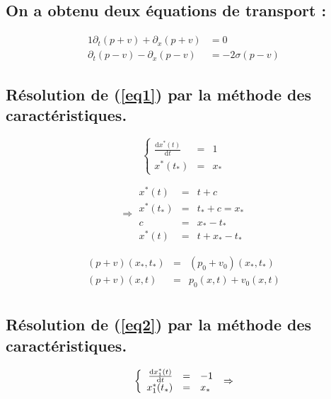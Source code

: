 \documentclass[a4paper,11pt]{article}
\begin{document}
\subsection*{On a obtenu deux équations de transport :}
\begin{alignat}{1}
    \partial_{t}(p+v) + \partial_{x}(p+v) &= 0 \label{eq1} \\
    \partial_{t}(p-v) - \partial_{x}(p-v) &= -2\sigma(p-v) \label{eq2}
\end{alignat}

\subsection*{Résolution de (\ref{eq1}) par la méthode des caractéristiques.}

\begin{equation*}
\left\{
\begin{array}{rcl} 
    \frac{\mathrm{d}x^{*}(t)}{\mathrm{d}t} &=& 1 \\    
    x^{*}(t_{*}) &=& x_{*}
\end{array}
\right.
\end{equation*}

\begin{equation*}
\Rightarrow
\begin{array}{rcl}
x^{*}(t) &=& t +c \\
x^{*}(t_{*}) &=& t_{*}+c = x_{*}\\
c &=& x_{*}-t_{*} \\
x^{*}(t) &=& t + x_{*}-t_{*}
\end{array}
\end{equation*}

\begin{equation*}
\begin{array}{rcl}
    (p+v)(x_{*},t_{*}) &=& (p_{0}+v_{0})(x_{*},t_{*}) \\
    (p+v)(x,t) &=& p_{0}(x,t) + v_{0}(x,t)\\
\end{array}
\end{equation*}

\subsection*{Résolution de (\ref{eq2}) par la méthode des caractéristiques.}

\begin{equation*}
\left\{
\begin{array}{rcl}
    \frac{\mathrm{d}x_{1}^{*}(t)}{\mathrm{d}t} &=& -1 \\    
    x_{1}^{*}(t_{*}) &=& x_{*}
\end{array}
\right. \\
\Rightarrow
\end{equation*}
\end{document}
